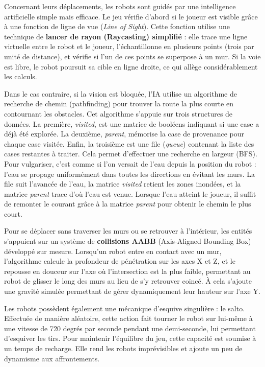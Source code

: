\documentclass[a4paper,11pt]{article}
\begin{document}
Concernant leurs déplacements, les robots sont guidés par une intelligence artificielle simple mais efficace. Le jeu vérifie d'abord si le joueur est visible grâce 
à une fonction de ligne de vue (\emph{Line of Sight}). Cette fonction utilise une technique de \textbf{lancer de rayon (Raycasting) simplifié} : elle trace une 
ligne virtuelle entre le robot et le joueur, l'échantillonne en plusieurs points (trois par unité de distance), et vérifie si l'un de ces points se superpose à un 
mur. Si la voie est libre, le robot poursuit sa cible en ligne droite, ce qui allège considérablement les calculs.

Dans le cas contraire, si la vision est bloquée, l'IA utilise un algorithme de recherche de chemin (pathfinding) pour trouver la route la plus courte en 
contournant les obstacles. Cet algorithme s'appuie sur trois structures de données. La première, \emph{visited}, est une matrice de booléens indiquant si une 
case a déjà été explorée. La deuxième, \emph{parent}, mémorise la case de provenance pour chaque case visitée. Enfin, la troisième est une file (\emph{queue}) 
contenant la liste des cases restantes à traiter. Cela permet d'effectuer une recherche en largeur (BFS). Pour vulgariser, c'est comme si l'on versait de l'eau 
depuis la position du robot : l'eau se propage uniformément dans toutes les directions en évitant les murs. La file suit l'avancée de l'eau, la matrice 
\emph{visited} retient les zones inondées, et la matrice \emph{parent} trace d'où l'eau est venue. Lorsque l'eau atteint le joueur, il suffit de remonter le 
courant grâce à la matrice \emph{parent} pour obtenir le chemin le plus court.

Pour se déplacer sans traverser les murs ou se retrouver à l'intérieur, les entités s'appuient sur un système de \textbf{collisions AABB} (Axis-Aligned Bounding 
Box) développé sur mesure. Lorsqu'un robot entre en contact avec un mur, l'algorithme calcule la profondeur de pénétration sur les axes X et Z, et le repousse en 
douceur sur l'axe où l'intersection est la plus faible, permettant au robot de glisser le long des murs au lieu de s'y retrouver coincé. À cela s'ajoute une 
gravité simulée permettant de gérer dynamiquement leur hauteur sur l'axe Y.

Les robots possèdent également une mécanique d'esquive singulière : le salto. Effectuée de manière aléatoire, cette action fait tourner le robot sur lui-même à une 
vitesse de 720 degrés par seconde pendant une demi-seconde, lui permettant d'esquiver les tirs. Pour maintenir l'équilibre du jeu, cette capacité est soumise à 
un temps de recharge. Elle rend les robots imprévisibles et ajoute un peu de dynamisme aux affrontements.
\end{document}
